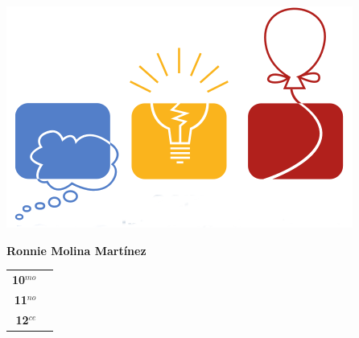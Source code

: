 \begin{minipage}{0.2\textwidth}
	\includegraphics[width=\linewidth]{img/icpc.png} %
\end{minipage}
\hfill
\begin{minipage}{0.7\textwidth}
	\textbf{Ronnie Molina Martínez}
	
	\vspace*{0.1in}
	\begin{tabular}{rl}
		
		\textbf{10$^{mo}$} &   \\
		
		\textbf{11$^{no}$} &  \\
		
		\textbf{12$^{ce}$} &   \\
		
		
	\end{tabular}
\end{minipage}

